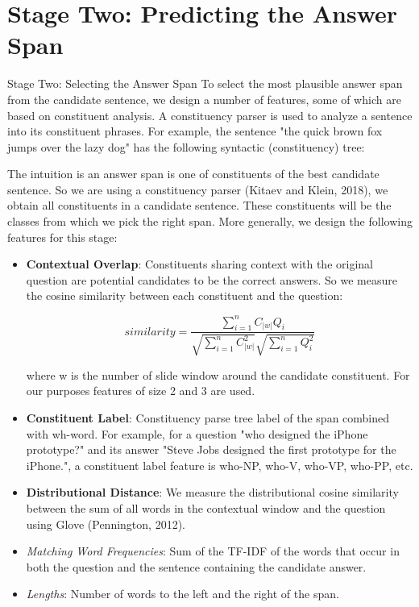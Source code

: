 \newpage

\section{Stage Two: Predicting the Answer Span}

Stage Two: Selecting the Answer Span
To select the most plausible answer span from the candidate sentence, we design a number of features, some of which are based on constituent analysis. A constituency parser is used to analyze a sentence into its constituent phrases. For example, the sentence "the quick brown fox jumps over the lazy dog" has the following syntactic (constituency) tree:


The intuition is an answer span is one of constituents of the best candidate sentence. So we are using a constituency parser (Kitaev and Klein, 2018), we obtain all constituents in a candidate sentence. These constituents will be the classes from which we pick the right span. More generally, we design the following features for this stage:

\begin{itemize}
\item \textbf{Contextual Overlap}: Constituents sharing context with the original question are potential candidates to be the correct answers. So we measure the cosine similarity between each constituent and the question:

$${ similarity } = \frac { \sum _ { i = 1 } ^ { n } C _ { |w| } Q _ { i } } { \sqrt { \sum _ { i = 1 } ^ { n } C _ { |w| } ^ { 2 } } \sqrt { \sum _ { i = 1 } ^ { n } Q _ { i } ^ { 2 } } }$$ 

where w is the number of slide window around the candidate constituent. For our purposes features of size 2 and 3 are used.


\item \textbf{Constituent Label}: Constituency parse tree label of the span combined with wh-word. For example, for a question "who designed the iPhone prototype?" and its answer "Steve Jobs designed the first prototype for the iPhone.", a constituent label feature is {who-NP, who-V, who-VP, who-PP, etc}. 
\item \textbf{Distributional Distance}: We measure the distributional cosine similarity between the sum of all words in the contextual window and the question using Glove (Pennington, 2012).
\item \emph{Matching Word Frequencies}: Sum of the TF-IDF of the words that occur in both the question and the sentence containing the candidate answer.
\item \emph{Lengths}: Number of words to the left and the right of the span.
\end{itemize}

